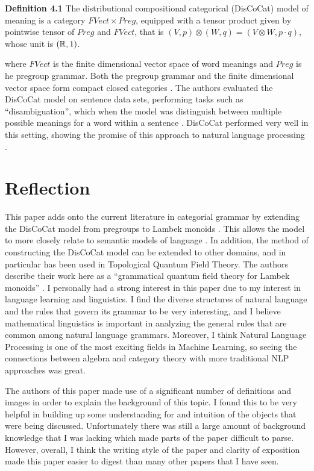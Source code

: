 \documentclass[11pt, reqno]{amsart}
\theoremstyle{plain}
\theoremstyle{definition}
\theoremstyle{example}
\begin{document}
\par
\textbf{Definition 4.1} \cite[\S 4.1]{lambekvlambek} The distributional compositional categorical (DisCoCat) model of meaning is a category $FVect \times Preg$, equipped with a tensor product given by pointwise tensor of $Preg$ and $FVect$, that is $(V, p) \otimes (W, q) = (V \otimes W, p \cdot q)$, whose unit is $(\mathbb{R}, 1)$.

\par
where $FVect$ is the finite dimensional vector space of word meanings and $Preg$ is he pregroup grammar. Both the pregroup grammar and the finite dimensional vector space form compact closed categories \cite[\S 4.1]{lambekvlambek}. The authors evaluated the DisCoCat model on sentence data sets, performing tasks such as ``disambiguation'', which when the model was distinguish between multiple possible meanings for a word within a sentence \cite[\S 5.2]{lambekvlambek}. DisCoCat performed very well in this setting, showing the promise of this approach to natural language processing  \cite[\S 5.2]{lambekvlambek}.

\newpage
\section{Reflection}

\par
This paper adds onto the current literature in categorial grammar by extending the DisCoCat model from pregroups to Lambek monoids \cite{lambekvlambek}. This allows the model to more closely relate to semantic models of language \cite{lambekvlambek}. In addition, the method of constructing the DisCoCat model can be extended to other domains, and in particular has been used in Topological Quantum Field Theory. The authors describe their work here as a ``grammatical quantum field theory for Lambek monoids'' \cite{lambekvlambek}. I personally had a strong interest in this paper due to my interest in language learning and linguistics. I find the diverse structures of natural language and the rules that govern its grammar to be very interesting, and I believe mathematical linguistics is important in analyzing the general rules that are common among natural language grammars. Moreover, I think Natural Language Processing is one of the most exciting fields in Machine Learning, so seeing the connections between algebra and category theory with more traditional NLP approaches was great.

\par
The authors of this paper made use of a significant number of definitions and images in order to explain the background of this topic. I found this to be very helpful in building up some understanding for and intuition of the objects that were being discussed. Unfortunately there was still a large amount of background knowledge that I was lacking which made parts of the paper difficult to parse. However, overall, I think the writing style of the paper and clarity of exposition made this paper easier to digest than many other papers that I have seen.
\end{document}
